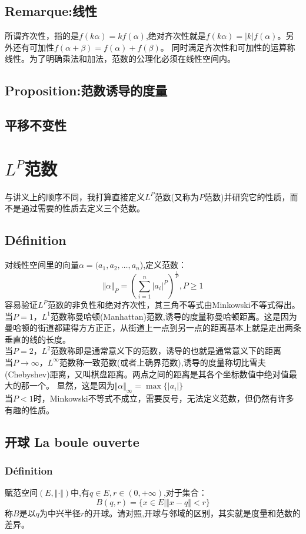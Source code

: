 \documentclass[12pt, a4paper, oneside]{ctexbook}
\begin{document}
  \subsection{Remarque:线性}
  所谓齐次性，指的是$f(k\alpha)=kf(\alpha)$,绝对齐次性就是$f(k\alpha)= | k | f(\alpha)$。另外还有可加性$f(\alpha+\beta)=f(\alpha)+f(\beta)$。
  同时满足齐次性和可加性的运算称线性。为了明确乘法和加法，范数的公理化必须在线性空间内。
  \subsection{Proposition:范数诱导的度量}
  \subsection{平移不变性}


\section{$L^P$范数}\label{myref:LPnorme}
与讲义上的顺序不同，我打算直接定义$L^P$范数(又称为$P$范数)并研究它的性质，而不是通过需要的性质去定义三个范数。
  \subsection{Définition}
  对线性空间里的向量$\alpha=(a_1,a_2,\dots,a_n$),定义范数：
  $$
    \Vert \alpha\Vert_P=(\sum_{i=1}^{n}|a_i|^P)^{\frac{1}{P}},P\ge1  
  $$
  容易验证$L^P$范数的非负性和绝对齐次性，其三角不等式由Minkowski不等式得出。\\
  当$P=1$，$L^1$范数称曼哈顿(Manhattan)范数,诱导的度量称曼哈顿距离。这是因为曼哈顿的街道都建得方方正正，从街道上一点到另一点的距离基本上就是走出两条垂直的线的长度。\\
  当$P=2$，$L^2$范数称即是通常意义下的范数，诱导的也就是通常意义下的距离\\
  当$P\rightarrow \infty$，$L^\infty$范数称一致范数(或者上确界范数),诱导的度量称切比雪夫(Chebyshev)距离，又叫棋盘距离。两点之间的距离是其各个坐标数值中绝对值最大的那一个。
  显然，这是因为$\Vert \alpha\Vert_\infty=\max\{|a_i|\}$\\
  当$P<1$时，Minkowski不等式不成立，需要反号，无法定义范数，但仍然有许多有趣的性质。
  \subsection{开球 La boule ouverte}
  \subsubsection{Définition}
  赋范空间$(E,\Vert \cdot \Vert)$中,有$q\in E,r\in(0,+\infty)$,对于集合：
  $$
    B(q,r)=\{x\in E |\Vert x-q \Vert<r \}
  $$
  称$B$是以$q$为中兴半径$r$的开球。请对照,开球与邻域的区别，其实就是度量和范数的差异。
\end{document}

